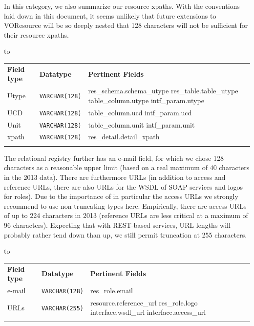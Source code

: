\documentclass[11pt,a4paper]{ivoa}
\newcommand{\sptablerule}{\noalign{\vspace{2pt}}\hline\noalign{\vspace{2pt}}}
\newenvironment{inlinetable}{\vfil\penalty8000\vfilneg%
    \hbox to\hsize\bgroup\hss}
  {\hss\egroup\vspace{8pt}}
\begin{document}
In this category, we also summarize our resource xpaths.  With the
conventions laid down in this document, it seems unlikely that future
extensions to VOResource will be so deeply nested that 128 characters
will not be sufficient for their resource xpaths.

\begin{inlinetable}
\begin{tabular}{llp{6cm}}
\sptablerule
\textbf{Field type}&
\textbf{Datatype}&
\textbf{Pertinent Fields}\\
\sptablerule
Utype&\texttt{VARCHAR(128)}&res\_schema.schema\_utype\hfil\break
res\_table.table\_utype\hfil\break
table\_column.utype\hfil\break
intf\_param.utype\\
\sptablerule
UCD&\texttt{VARCHAR(128)}&
          table\_column.ucd\hfil\break
          intf\_param.ucd\\
\sptablerule
Unit&\texttt{VARCHAR(128)}&
          table\_column.unit\hfil\break
          intf\_param.unit\\
\sptablerule
xpath&\texttt{VARCHAR(128)}&
          res\_detail.detail\_xpath \\
\sptablerule
\end{tabular}
\end{inlinetable}

The relational registry further has an
e-mail field, for which we chose 128 characters as a reasonable upper
limit (based on a real maximum of 40 characters in the 2013 data).
There are furthermore URLs (in addition to access and reference URLs,
there are also URLs for the WSDL of SOAP services and logos for roles).
Due to the importance of in particular the access URLs we strongly
recommend to use non-truncating types here.  Empirically, there are
access URLs of up to 224 characters in 2013 (reference URLs are less
critical at a maximum of 96 characters).  Expecting that with REST-based
services, URL lengths will probably rather tend down than up, we still
permit truncation at 255 characters.


\begin{inlinetable}
\begin{tabular}{llp{6cm}}
\sptablerule
\textbf{Field type}&
\textbf{Datatype}&
\textbf{Pertinent Fields}\\
\sptablerule
e-mail&\texttt{VARCHAR(128)}&
          res\_role.email\\
\sptablerule
URLs&\texttt{VARCHAR(255)}&resource.reference\_url\hfil\break
          res\_role.logo\hfil\break
          interface.wsdl\_url\hfil\break
          interface.access\_url \\
\sptablerule
\end{tabular}
\end{inlinetable}
\end{document}
